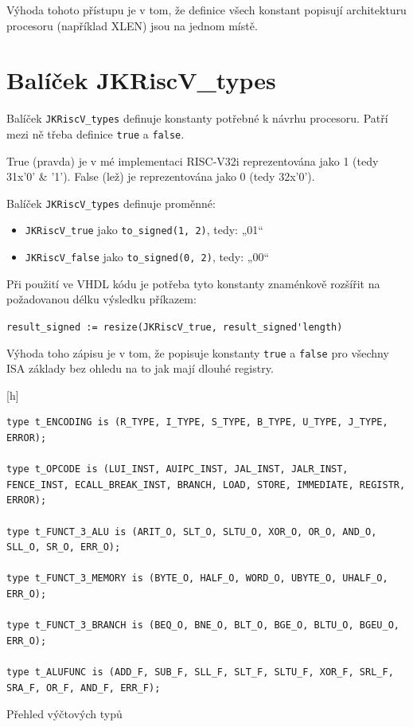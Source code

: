 \documentclass[FM,BP]{tulthesis}
\newenvironment{myquote}{\begin{list}{}{\setlength\leftmargin\parindent}\item[]}{\end{list}}
\newenvironment{listing}{\begin{myquote}\color{\tulcolor}}{\end{myquote}}
\begin{document}
Výhoda tohoto přístupu je v tom, že definice všech konstant popisují architekturu procesoru (například XLEN) jsou na jednom místě.

\section{Balíček JKRiscV\_types}
Balíček \verb|JKRiscV_types| definuje konstanty potřebné k návrhu procesoru. Patří mezi ně třeba definice \verb|true| a \verb|false|. 

True (pravda) je v mé implementaci RISC-V32i reprezentována jako 1 (tedy 31x'0' \& '1'). False (lež) je reprezentována jako 0 (tedy 32x'0').

Balíček \verb|JKRiscV_types| definuje proměnné:
\begin{itemize}
    \item \verb|JKRiscV_true| jako \verb|to_signed(1, 2)|, tedy: „01“
    \item \verb|JKRiscV_false| jako \verb|to_signed(0, 2)|, tedy: „00“
\end{itemize}
Při použití ve VHDL kódu je potřeba tyto konstanty znaménkově rozšířit na požadovanou délku výsledku příkazem: 

\verb|result_signed := resize(JKRiscV_true, result_signed'length)|

Výhoda toho zápisu je v tom, že popisuje konstanty \verb|true| a \verb|false| pro všechny ISA základy bez ohledu na to jak mají dlouhé registry. 


\begin{listing}[h]
    \begin{verbatim}
type t_ENCODING is (R_TYPE, I_TYPE, S_TYPE, B_TYPE, U_TYPE, J_TYPE, ERROR);

type t_OPCODE is (LUI_INST, AUIPC_INST, JAL_INST, JALR_INST, FENCE_INST, ECALL_BREAK_INST, BRANCH, LOAD, STORE, IMMEDIATE, REGISTR, ERROR);

type t_FUNCT_3_ALU is (ARIT_O, SLT_O, SLTU_O, XOR_O, OR_O, AND_O, SLL_O, SR_O, ERR_O);

type t_FUNCT_3_MEMORY is (BYTE_O, HALF_O, WORD_O, UBYTE_O, UHALF_O, ERR_O);

type t_FUNCT_3_BRANCH is (BEQ_O, BNE_O, BLT_O, BGE_O, BLTU_O, BGEU_O, ERR_O);

type t_ALUFUNC is (ADD_F, SUB_F, SLL_F, SLT_F, SLTU_F, XOR_F, SRL_F, SRA_F, OR_F, AND_F, ERR_F);
    \end{verbatim}
    \caption{Přehled výčtových typů}
    \label{listing:vhdl_enums}
\end{listing}
\end{document}
